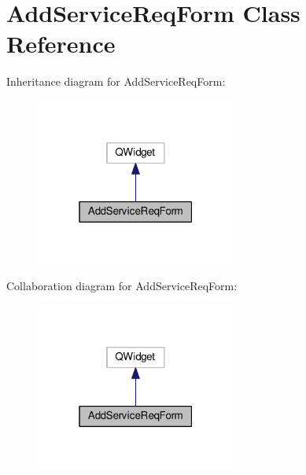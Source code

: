 \hypertarget{class_add_service_req_form}{}\section{Add\+Service\+Req\+Form Class Reference}
\label{class_add_service_req_form}


Inheritance diagram for Add\+Service\+Req\+Form\+:
\nopagebreak
\begin{figure}[H]
\begin{center}
\leavevmode
\includegraphics[width=187pt]{class_add_service_req_form__inherit__graph}
\end{center}
\end{figure}


Collaboration diagram for Add\+Service\+Req\+Form\+:
\nopagebreak
\begin{figure}[H]
\begin{center}
\leavevmode
\includegraphics[width=187pt]{class_add_service_req_form__coll__graph}
\end{center}
\end{figure}
